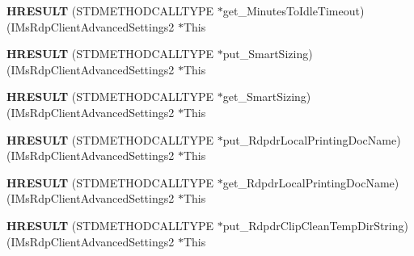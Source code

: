 \begin{DoxyCompactItemize}
\item 
\mbox{\label{struct_i_ms_rdp_client_advanced_settings2_vtbl_a268f6dd66406a853f966a5fcd43a0922}} 
{\bfseries H\+R\+E\+S\+U\+LT} (S\+T\+D\+M\+E\+T\+H\+O\+D\+C\+A\+L\+L\+T\+Y\+PE $\ast$get\+\_\+\+Minutes\+To\+Idle\+Timeout)(I\+Ms\+Rdp\+Client\+Advanced\+Settings2 $\ast$This
\item 
\mbox{\label{struct_i_ms_rdp_client_advanced_settings2_vtbl_ae4f9fe9d606cc3699141e755301ec5cf}} 
{\bfseries H\+R\+E\+S\+U\+LT} (S\+T\+D\+M\+E\+T\+H\+O\+D\+C\+A\+L\+L\+T\+Y\+PE $\ast$put\+\_\+\+Smart\+Sizing)(I\+Ms\+Rdp\+Client\+Advanced\+Settings2 $\ast$This
\item 
\mbox{\label{struct_i_ms_rdp_client_advanced_settings2_vtbl_a27c8e451b2baa90ffc26f9db32c9c474}} 
{\bfseries H\+R\+E\+S\+U\+LT} (S\+T\+D\+M\+E\+T\+H\+O\+D\+C\+A\+L\+L\+T\+Y\+PE $\ast$get\+\_\+\+Smart\+Sizing)(I\+Ms\+Rdp\+Client\+Advanced\+Settings2 $\ast$This
\item 
\mbox{\label{struct_i_ms_rdp_client_advanced_settings2_vtbl_ae35511c74ab3b10cd3517c5cfcd25aea}} 
{\bfseries H\+R\+E\+S\+U\+LT} (S\+T\+D\+M\+E\+T\+H\+O\+D\+C\+A\+L\+L\+T\+Y\+PE $\ast$put\+\_\+\+Rdpdr\+Local\+Printing\+Doc\+Name)(I\+Ms\+Rdp\+Client\+Advanced\+Settings2 $\ast$This
\item 
\mbox{\label{struct_i_ms_rdp_client_advanced_settings2_vtbl_aca588b769806521f7635c16d560c0606}} 
{\bfseries H\+R\+E\+S\+U\+LT} (S\+T\+D\+M\+E\+T\+H\+O\+D\+C\+A\+L\+L\+T\+Y\+PE $\ast$get\+\_\+\+Rdpdr\+Local\+Printing\+Doc\+Name)(I\+Ms\+Rdp\+Client\+Advanced\+Settings2 $\ast$This
\item 
\mbox{\label{struct_i_ms_rdp_client_advanced_settings2_vtbl_a747b083eab7c8e9edd15b0b37f0c6457}} 
{\bfseries H\+R\+E\+S\+U\+LT} (S\+T\+D\+M\+E\+T\+H\+O\+D\+C\+A\+L\+L\+T\+Y\+PE $\ast$put\+\_\+\+Rdpdr\+Clip\+Clean\+Temp\+Dir\+String)(I\+Ms\+Rdp\+Client\+Advanced\+Settings2 $\ast$This
\item 
\mbox{\label{struct_i_ms_rdp_client_advanced_settings2_vtbl_ab4e4476fd1cd60beb4ac5e035fdf2f19}} 

\end{DoxyCompactItemize}
